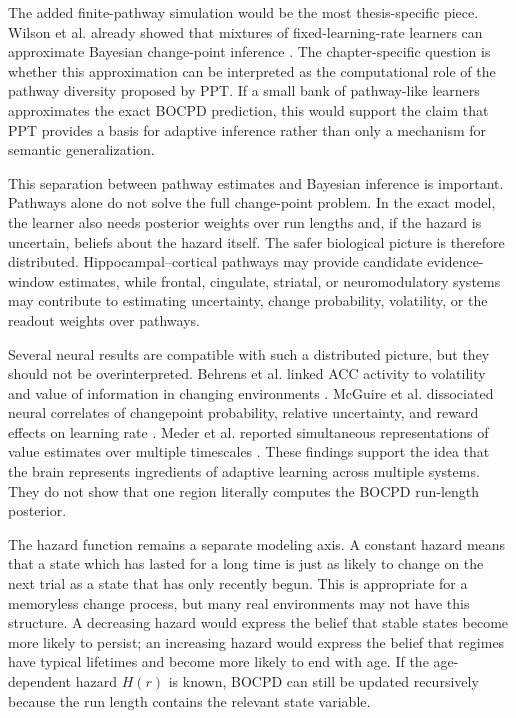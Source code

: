 The added finite-pathway simulation would be the most thesis-specific piece. Wilson et al. already showed that mixtures of fixed-learning-rate learners can approximate Bayesian change-point inference \citep{Wilson2013}. The chapter-specific question is whether this approximation can be interpreted as the computational role of the pathway diversity proposed by PPT. If a small bank of pathway-like learners approximates the exact BOCPD prediction, this would support the claim that PPT provides a basis for adaptive inference rather than only a mechanism for semantic generalization.

This separation between pathway estimates and Bayesian inference is important. Pathways alone do not solve the full change-point problem. In the exact model, the learner also needs posterior weights over run lengths and, if the hazard is uncertain, beliefs about the hazard itself. The safer biological picture is therefore distributed. Hippocampal--cortical pathways may provide candidate evidence-window estimates, while frontal, cingulate, striatal, or neuromodulatory systems may contribute to estimating uncertainty, change probability, volatility, or the readout weights over pathways.

Several neural results are compatible with such a distributed picture, but they should not be overinterpreted. Behrens et al. linked ACC activity to volatility and value of information in changing environments \citep{Behrens2007}. McGuire et al. dissociated neural correlates of changepoint probability, relative uncertainty, and reward effects on learning rate \citep{McGuire2014}. Meder et al. reported simultaneous representations of value estimates over multiple timescales \citep{Meder2017}. These findings support the idea that the brain represents ingredients of adaptive learning across multiple systems. They do not show that one region literally computes the BOCPD run-length posterior.

The hazard function remains a separate modeling axis. A constant hazard means that a state which has lasted for a long time is just as likely to change on the next trial as a state that has only recently begun. This is appropriate for a memoryless change process, but many real environments may not have this structure. A decreasing hazard would express the belief that stable states become more likely to persist; an increasing hazard would express the belief that regimes have typical lifetimes and become more likely to end with age. If the age-dependent hazard \(H(r)\) is known, BOCPD can still be updated recursively because the run length contains the relevant state variable.

